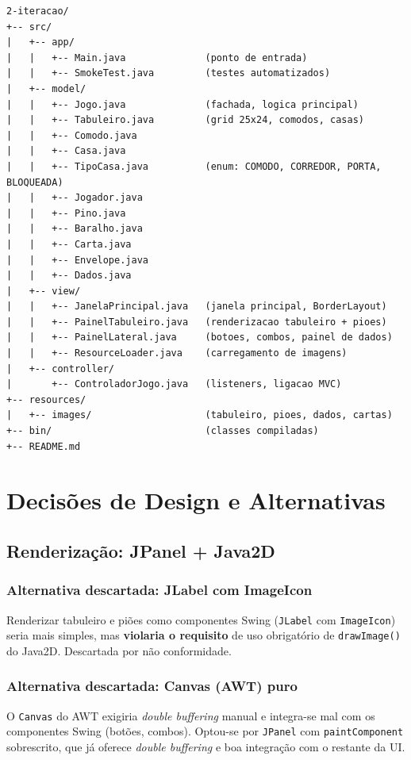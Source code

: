 \documentclass[12pt,a4paper]{report}
\begin{document}
\begin{lstlisting}
2-iteracao/
+-- src/
|   +-- app/
|   |   +-- Main.java              (ponto de entrada)
|   |   +-- SmokeTest.java         (testes automatizados)
|   +-- model/
|   |   +-- Jogo.java              (fachada, logica principal)
|   |   +-- Tabuleiro.java         (grid 25x24, comodos, casas)
|   |   +-- Comodo.java
|   |   +-- Casa.java
|   |   +-- TipoCasa.java          (enum: COMODO, CORREDOR, PORTA, BLOQUEADA)
|   |   +-- Jogador.java
|   |   +-- Pino.java
|   |   +-- Baralho.java
|   |   +-- Carta.java
|   |   +-- Envelope.java
|   |   +-- Dados.java
|   +-- view/
|   |   +-- JanelaPrincipal.java   (janela principal, BorderLayout)
|   |   +-- PainelTabuleiro.java   (renderizacao tabuleiro + pioes)
|   |   +-- PainelLateral.java     (botoes, combos, painel de dados)
|   |   +-- ResourceLoader.java    (carregamento de imagens)
|   +-- controller/
|       +-- ControladorJogo.java   (listeners, ligacao MVC)
+-- resources/
|   +-- images/                    (tabuleiro, pioes, dados, cartas)
+-- bin/                           (classes compiladas)
+-- README.md
\end{lstlisting}

\chapter{Decisões de Design e Alternativas}

\section{Renderização: JPanel + Java2D}

\subsection{Alternativa descartada: JLabel com ImageIcon}

Renderizar tabuleiro e piões como componentes Swing (\texttt{JLabel} com \texttt{ImageIcon}) seria mais simples, mas \textbf{violaria o requisito} de uso obrigatório de \texttt{drawImage()} do Java2D. Descartada por não conformidade.

\subsection{Alternativa descartada: Canvas (AWT) puro}

O \texttt{Canvas} do AWT exigiria \textit{double buffering} manual e integra-se mal com os componentes Swing (botões, combos). Optou-se por \texttt{JPanel} com \texttt{paintComponent} sobrescrito, que já oferece \textit{double buffering} e boa integração com o restante da UI.
\end{document}
